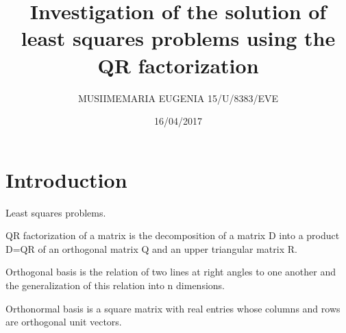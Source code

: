 \documentclass[12pt, letterpaper]{article}
\begin{document}


\noindent
    \title{Investigation of the solution of least squares problems using the QR factorization}
    \author{MUSIIMEMARIA EUGENIA 15/U/8383/EVE \\}
    \date{16/04/2017}
    \maketitle
\section{Introduction}
    Least squares problems. \par
    QR factorization of a matrix is the decomposition of a matrix D into a product D=QR of an orthogonal matrix Q and an upper triangular matrix R.\par
    Orthogonal basis is the relation of two lines at right angles to one another and the generalization of this relation into n dimensions.\par
    Orthonormal basis is a square matrix with real entries whose columns and rows are orthogonal unit vectors.\par
\end{document}
